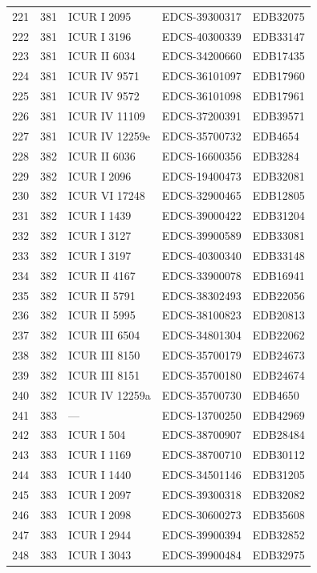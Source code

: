 \begin{longtable}{@{}r r l l l@{}}
221 & 381 & ICUR I 2095 & EDCS-39300317 & EDB32075 \\
222 & 381 & ICUR I 3196 & EDCS-40300339 & EDB33147 \\
223 & 381 & ICUR II 6034 & EDCS-34200660 & EDB17435 \\
224 & 381 & ICUR IV 9571 & EDCS-36101097 & EDB17960 \\
225 & 381 & ICUR IV 9572 & EDCS-36101098 & EDB17961 \\
226 & 381 & ICUR IV 11109 & EDCS-37200391 & EDB39571 \\
227 & 381 & ICUR IV 12259e & EDCS-35700732 & EDB4654 \\
228 & 382 & ICUR II 6036 & EDCS-16600356 & EDB3284 \\
229 & 382 & ICUR I 2096 & EDCS-19400473 & EDB32081 \\
230 & 382 & ICUR VI 17248 & EDCS-32900465 & EDB12805 \\
231 & 382 & ICUR I 1439 & EDCS-39000422 & EDB31204 \\
232 & 382 & ICUR I 3127 & EDCS-39900589 & EDB33081 \\
233 & 382 & ICUR I 3197 & EDCS-40300340 & EDB33148 \\
234 & 382 & ICUR II 4167 & EDCS-33900078 & EDB16941 \\
235 & 382 & ICUR II 5791 & EDCS-38302493 & EDB22056 \\
236 & 382 & ICUR II 5995 & EDCS-38100823 & EDB20813 \\
237 & 382 & ICUR III 6504 & EDCS-34801304 & EDB22062 \\
238 & 382 & ICUR III 8150 & EDCS-35700179 & EDB24673 \\
239 & 382 & ICUR III 8151 & EDCS-35700180 & EDB24674 \\
240 & 382 & ICUR IV 12259a & EDCS-35700730 & EDB4650 \\
241 & 383 & — & EDCS-13700250 & EDB42969 \\
242 & 383 & ICUR I 504 & EDCS-38700907 & EDB28484 \\
243 & 383 & ICUR I 1169 & EDCS-38700710 & EDB30112 \\
244 & 383 & ICUR I 1440 & EDCS-34501146 & EDB31205 \\
245 & 383 & ICUR I 2097 & EDCS-39300318 & EDB32082 \\
246 & 383 & ICUR I 2098 & EDCS-30600273 & EDB35608 \\
247 & 383 & ICUR I 2944 & EDCS-39900394 & EDB32852 \\
248 & 383 & ICUR I 3043 & EDCS-39900484 & EDB32975 \\

\end{longtable}
